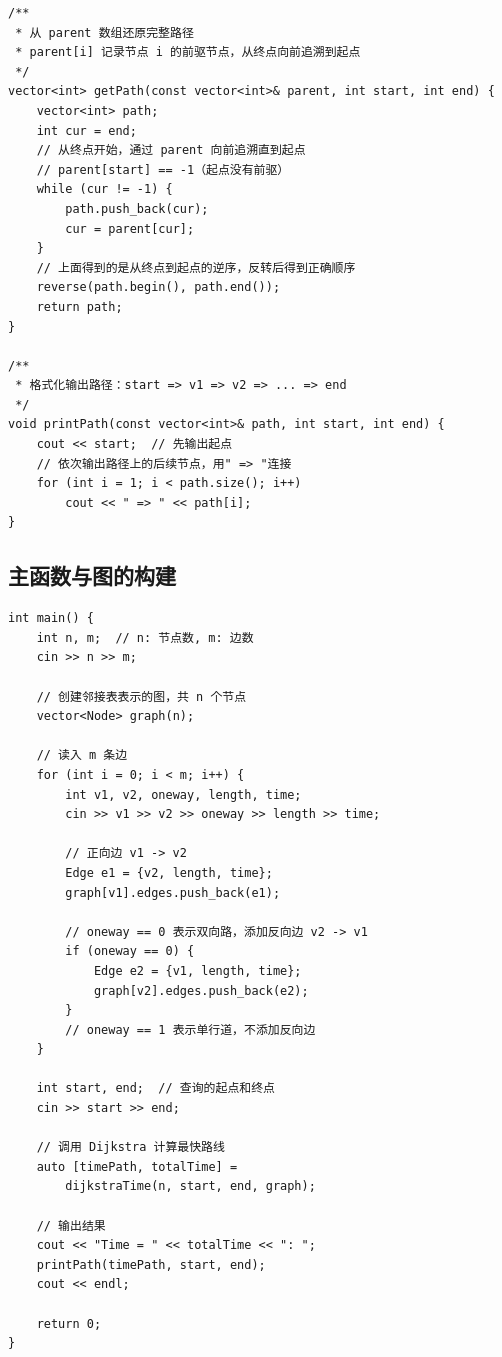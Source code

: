 \documentclass[12pt,a4paper]{article}
\begin{document}
\begin{lstlisting}
/**
 * 从 parent 数组还原完整路径
 * parent[i] 记录节点 i 的前驱节点，从终点向前追溯到起点
 */
vector<int> getPath(const vector<int>& parent, int start, int end) {
    vector<int> path;
    int cur = end;
    // 从终点开始，通过 parent 向前追溯直到起点
    // parent[start] == -1（起点没有前驱）
    while (cur != -1) {
        path.push_back(cur);
        cur = parent[cur];
    }
    // 上面得到的是从终点到起点的逆序，反转后得到正确顺序
    reverse(path.begin(), path.end());
    return path;
}

/**
 * 格式化输出路径：start => v1 => v2 => ... => end
 */
void printPath(const vector<int>& path, int start, int end) {
    cout << start;  // 先输出起点
    // 依次输出路径上的后续节点，用" => "连接
    for (int i = 1; i < path.size(); i++)
        cout << " => " << path[i];
}
\end{lstlisting}

\subsection{主函数与图的构建}

\begin{lstlisting}
int main() {
    int n, m;  // n: 节点数, m: 边数
    cin >> n >> m;

    // 创建邻接表表示的图，共 n 个节点
    vector<Node> graph(n);

    // 读入 m 条边
    for (int i = 0; i < m; i++) {
        int v1, v2, oneway, length, time;
        cin >> v1 >> v2 >> oneway >> length >> time;

        // 正向边 v1 -> v2
        Edge e1 = {v2, length, time};
        graph[v1].edges.push_back(e1);

        // oneway == 0 表示双向路，添加反向边 v2 -> v1
        if (oneway == 0) {
            Edge e2 = {v1, length, time};
            graph[v2].edges.push_back(e2);
        }
        // oneway == 1 表示单行道，不添加反向边
    }

    int start, end;  // 查询的起点和终点
    cin >> start >> end;

    // 调用 Dijkstra 计算最快路线
    auto [timePath, totalTime] =
        dijkstraTime(n, start, end, graph);

    // 输出结果
    cout << "Time = " << totalTime << ": ";
    printPath(timePath, start, end);
    cout << endl;

    return 0;
}
\end{lstlisting}
\end{document}
